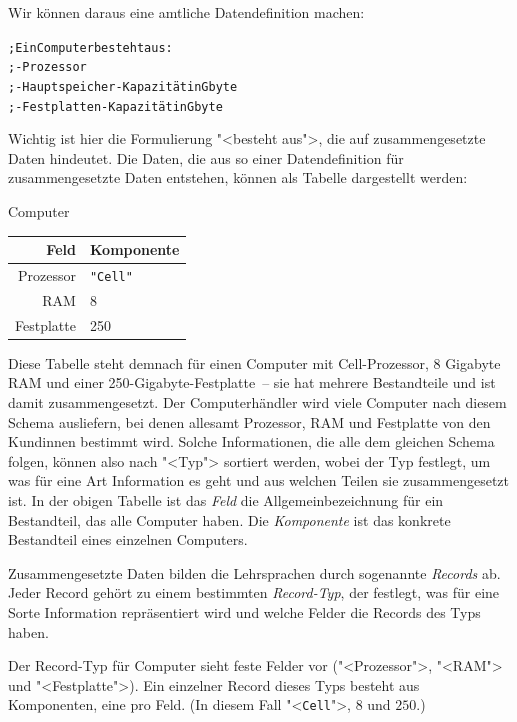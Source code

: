 Wir können daraus eine amtliche Datendefinition machen:
%
\begin{alltt}
; Ein Computer besteht aus:
; - Prozessor
; - Hauptspeicher-Kapazität in Gbyte
; - Festplatten-Kapazität in Gbyte
\end{alltt}
%
Wichtig ist hier die Formulierung "<besteht aus">, die auf
zusammengesetzte Daten hindeutet.  Die Daten, die aus so einer
Datendefinition für zusammengesetzte Daten entstehen, können als
Tabelle dargestellt werden:
%
\begin{center}
  Computer\qquad
  \begin{tabular}[c]{r|l}
    \textbf{Feld} & \textbf{Komponente}\\\hline
     Prozessor & \verb|"Cell"|\\
     RAM & 8\\
    Festplatte & 250
  \end{tabular}
\end{center}
%
Diese Tabelle steht demnach für einen Computer mit Cell-Prozessor, 8
Gigabyte RAM und einer 250-Gigabyte-Festplatte~-- sie hat mehrere
Bestandteile und ist damit zusammengesetzt.  Der Computerhändler wird
viele Computer nach diesem Schema ausliefern, bei denen allesamt
Prozessor, RAM und Festplatte von den Kundinnen bestimmt wird.  Solche
Informationen, die alle dem gleichen Schema folgen, können also nach
"<Typ"> sortiert werden, wobei der Typ
festlegt, um was für eine Art Information es geht und aus welchen
Teilen sie zusammengesetzt ist.  In der obigen Tabelle ist das
\textit{Feld} die Allgemeinbezeichnung für ein Bestandteil, das
alle Computer haben.  Die \textit{Komponente} ist das konkrete
Bestandteil eines einzelnen Computers.

Zusammengesetzte Daten bilden die Lehrsprachen durch
sogenannte \textit{Records} ab.  Jeder Record gehört
zu einem bestimmten
\textit{Record-Typ}, der festlegt, was für eine
Sorte Information repräsentiert wird und welche Felder die Records
des Typs haben.

Der Record-Typ für Computer sieht feste Felder
vor ("<Prozessor">, "<RAM"> und "<Festplatte">).  Ein einzelner Record
dieses Typs besteht aus Komponenten, eine pro
Feld. (In diesem Fall "<\texttt{Cell}">, $8$ und $250$.)

